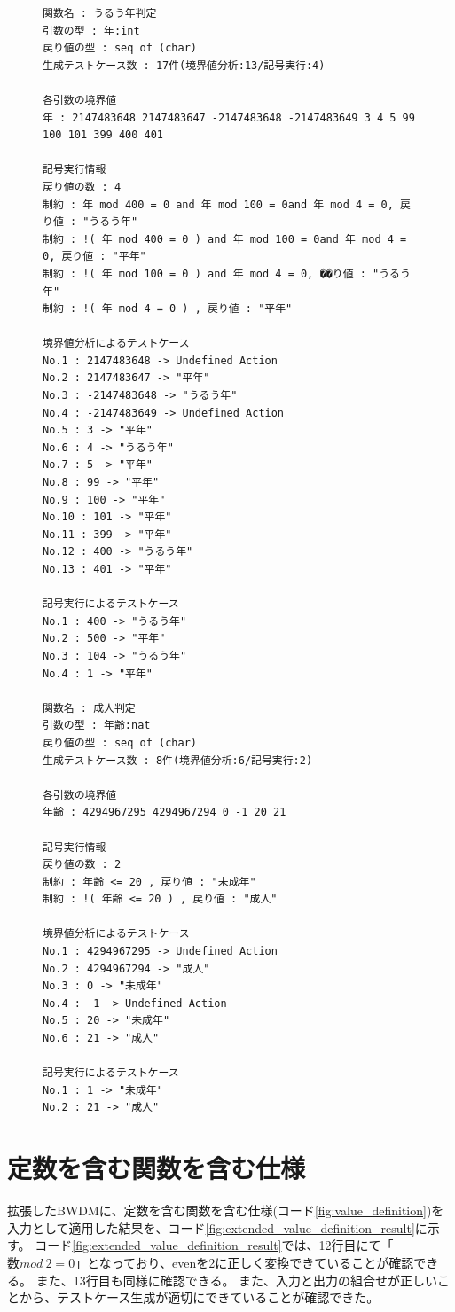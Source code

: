 \documentclass[uplatex, report, a4j, 10pt]{jsbook}
\begin{document}
\lstset{language=}
\begin{figure}[tp]
  \begin{lstlisting}[caption=拡張したBWDMに定数を含む関数を含む仕様(コード\ref{fig:value_definition})を適用した際の出力,label=fig:extended_func_multiple_result]
関数名 : うるう年判定
引数の型 : 年:int 
戻り値の型 : seq of (char)
生成テストケース数 : 17件(境界値分析:13/記号実行:4)

各引数の境界値
年 : 2147483648 2147483647 -2147483648 -2147483649 3 4 5 99 100 101 399 400 401 

記号実行情報
戻り値の数 : 4
制約 : 年 mod 400 = 0 and 年 mod 100 = 0and 年 mod 4 = 0, 戻り値 : "うるう年"
制約 : !( 年 mod 400 = 0 ) and 年 mod 100 = 0and 年 mod 4 = 0, 戻り値 : "平年"
制約 : !( 年 mod 100 = 0 ) and 年 mod 4 = 0, ��り値 : "うるう年"
制約 : !( 年 mod 4 = 0 ) , 戻り値 : "平年"

境界値分析によるテストケース
No.1 : 2147483648 -> Undefined Action
No.2 : 2147483647 -> "平年"
No.3 : -2147483648 -> "うるう年"
No.4 : -2147483649 -> Undefined Action
No.5 : 3 -> "平年"
No.6 : 4 -> "うるう年"
No.7 : 5 -> "平年"
No.8 : 99 -> "平年"
No.9 : 100 -> "平年"
No.10 : 101 -> "平年"
No.11 : 399 -> "平年"
No.12 : 400 -> "うるう年"
No.13 : 401 -> "平年"

記号実行によるテストケース
No.1 : 400 -> "うるう年"
No.2 : 500 -> "平年"
No.3 : 104 -> "うるう年"
No.4 : 1 -> "平年"

関数名 : 成人判定
引数の型 : 年齢:nat 
戻り値の型 : seq of (char)
生成テストケース数 : 8件(境界値分析:6/記号実行:2)

各引数の境界値
年齢 : 4294967295 4294967294 0 -1 20 21 

記号実行情報
戻り値の数 : 2
制約 : 年齢 <= 20 , 戻り値 : "未成年"
制約 : !( 年齢 <= 20 ) , 戻り値 : "成人"

境界値分析によるテストケース
No.1 : 4294967295 -> Undefined Action
No.2 : 4294967294 -> "成人"
No.3 : 0 -> "未成年"
No.4 : -1 -> Undefined Action
No.5 : 20 -> "未成年"
No.6 : 21 -> "成人"

記号実行によるテストケース
No.1 : 1 -> "未成年"
No.2 : 21 -> "成人"

\end{lstlisting}
\end{figure}

\section{定数を含む関数を含む仕様}\label{sec:tekiyou_value}
拡張したBWDMに、定数を含む関数を含む仕様(コード\ref{fig:value_definition})を入力として適用した結果を、コード\ref{fig:extended_value_definition_result}に示す。
コード\ref{fig:extended_value_definition_result}では、12行目にて「$数 mod \: 2 = 0$」となっており、evenを2に正しく変換できていることが確認できる。
また、13行目も同様に確認できる。
また、入力と出力の組合せが正しいことから、テストケース生成が適切にできていることが確認できた。
\end{document}
